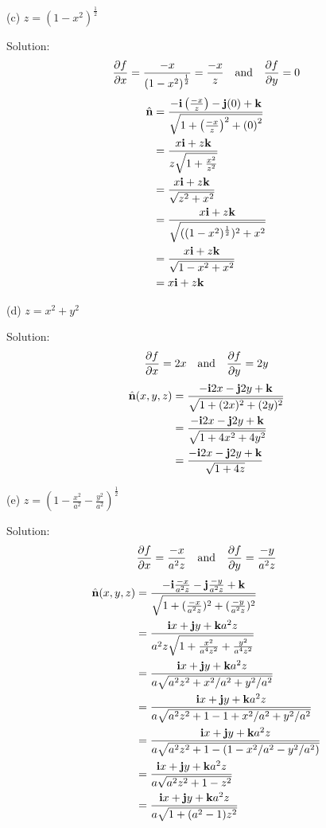 \documentclass{article}
\begin{document}
\begin{enumerate}
    (c) $z = (1-x^2)^\frac{1}{2}$

    Solution:
    \[ \frac{\partial{f}}{\partial{x}} = \frac{-x}{{(1 - x^2)}^\frac{1}{2}} = \frac{-x}{z} \quad \textnormal{and} \quad \frac{\partial{f}}{\partial{y}} = 0 \]
    \begin{align*}
        \hat{\textbf{n}} &= \frac{-\textbf{i} \left( \frac{-x}{z} \right) -\textbf{j}(0) + \textbf{k}} {\sqrt{1 + {\left( \frac{-x}{z} \right)}^2 + {(0)}^2 }} \\
        &= \frac{x\textbf{i} + z\textbf{k}} {z\sqrt{1 + { \frac{x^2}{z^2} } }} \\
        &= \frac{x\textbf{i} + z\textbf{k}} {\sqrt{z^2 + x^2 }} \\
        &= \frac{x\textbf{i} + z\textbf{k}} {\sqrt{((1-x^2)^\frac{1}{2})^2 + x^2 }} \\
        &= \frac{x\textbf{i} + z\textbf{k}} {\sqrt{1-x^2 + x^2 }} \\
        &= x\textbf{i} + z\textbf{k}
    \end{align*}

    (d) $z = x^2 + y^2$

    Solution:
    \[ \frac{\partial{f}}{\partial{x}} = 2x \quad \textnormal{and} \quad \frac{\partial{f}}{\partial{y}} = 2y \]
    \begin{align*}
        \hat{\textbf{n}}(x,y,z) &= \frac{-\textbf{i}2x -\textbf{j}2y + \textbf{k}} {\sqrt{1 + (2x)^2 + (2y)^2 }} \\
        &= \frac{-\textbf{i}2x -\textbf{j}2y + \textbf{k}} {\sqrt{1 + 4x^2 + 4y^2}} \\
        &= \frac{-\textbf{i}2x -\textbf{j}2y + \textbf{k}} {\sqrt{1 + 4z}} \\
    \end{align*}

    (e) $z = {\left( 1 - \frac{x^2}{a^2} - \frac{y^2}{a^2} \right)}^\frac{1}{2}$

    Solution:
    \[ \frac{\partial{f}}{\partial{x}} = \frac{-x}{a^2z} \quad \textnormal{and} \quad \frac{\partial{f}}{\partial{y}} = \frac{-y}{a^2z} \]
    \begin{align*}
        \hat{\textbf{n}}(x,y,z) &= \frac{-\textbf{i}\frac{-x}{a^2z} -\textbf{j}\frac{-y}{a^2z} + \textbf{k}} {\sqrt{1 + (\frac{-x}{a^2z})^2 + (\frac{-y}{a^2z})^2 }} \\
        &= \frac{\textbf{i}x + \textbf{j}y + \textbf{k}a^2z} {a^2z\sqrt{1 + \frac{x^2}{a^4z^2} + \frac{y^2}{a^4z^2} }} \\
        &= \frac{\textbf{i}x + \textbf{j}y + \textbf{k}a^2z} {a\sqrt{a^2z^2 + x^2/a^2 + y^2/a^2 }} \\
        &= \frac{\textbf{i}x + \textbf{j}y + \textbf{k}a^2z} {a\sqrt{a^2z^2 + 1 - 1 + x^2/a^2 + y^2/a^2 }} \\
        &= \frac{\textbf{i}x + \textbf{j}y + \textbf{k}a^2z} {a\sqrt{a^2z^2 + 1 - (1 - x^2/a^2 - y^2/a^2) }} \\
        &= \frac{\textbf{i}x + \textbf{j}y + \textbf{k}a^2z} {a\sqrt{a^2z^2 + 1 - z^2 }} \\
        &= \frac{\textbf{i}x + \textbf{j}y + \textbf{k}a^2z} {a\sqrt{1 + (a^2 - 1)z^2 }} \\
    \end{align*}

\end{enumerate}
\end{document}
